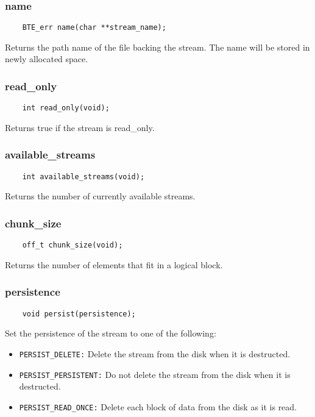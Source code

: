 \subsubsection{name}
\begin{verbatim}
    BTE_err name(char **stream_name);
\end{verbatim}
Returns the path name of the file backing the stream. The name will be
stored in newly allocated space.


\subsubsection{read\_only}
\begin{verbatim}
    int read_only(void);
\end{verbatim}
Returns true if the stream is read\_only.

    
\subsubsection{available\_streams}
\begin{verbatim}
    int available_streams(void);    
\end{verbatim}
Returns the number of currently available streams.

\subsubsection{chunk\_size}
\begin{verbatim}
    off_t chunk_size(void);
\end{verbatim}
Returns the number of elements that fit in a logical block.

\subsubsection{persistence}
\begin{verbatim}
    void persist(persistence);
\end{verbatim}
Set the persistence of the stream to one of the following:
\begin{itemize}
\item \verb|PERSIST_DELETE:| Delete the stream from the disk when it is
  destructed.
\item \verb|PERSIST_PERSISTENT:| Do not delete the stream from the disk when
  it is destructed.
\item \verb|PERSIST_READ_ONCE:| Delete each block of data from the disk as
  it is read.
\end{itemize}

